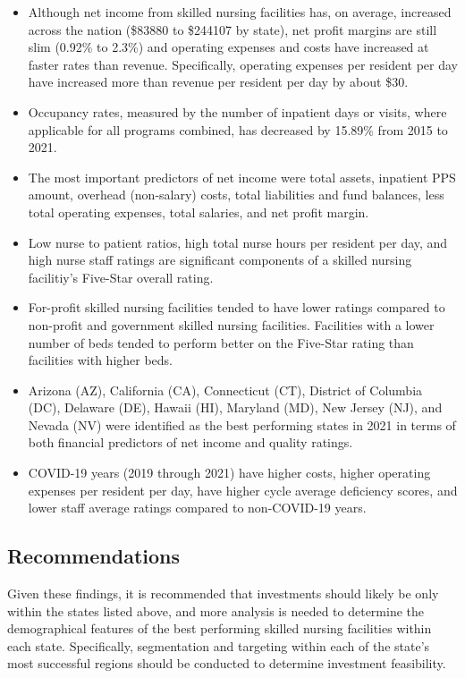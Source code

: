 \documentclass{article}
\theoremstyle{mytheoremstyle}
\theoremstyle{mytheoremstyle}
\theoremstyle{myproblemstyle}
\begin{document}
\begin{itemize}
    \item Although net income from skilled nursing facilities has, on average, increased across the nation (\$83880 to \$244107 by state), net profit margins are still slim (0.92\% to 2.3\%) and operating expenses and costs have increased at faster rates than revenue. Specifically, operating expenses per resident per day have increased more than revenue per resident per day by about \$30. 
    \item Occupancy rates, measured by the number of inpatient days or visits, where applicable for all programs combined, has decreased by 15.89\% from 2015 to 2021.
    \item The most important predictors of net income were total assets, inpatient PPS amount, overhead (non-salary) costs, total liabilities and fund balances, less total operating expenses, total salaries, and net profit margin.
    \item Low nurse to patient ratios, high total nurse hours per resident per day, and high nurse staff ratings are significant components of a skilled nursing facilitiy's Five-Star overall rating. 
    \item For-profit skilled nursing facilities tended to have lower ratings compared to non-profit and government skilled nursing facilities. Facilities with a lower number of beds tended to perform better on the Five-Star rating than facilities with higher beds.
    \item Arizona (AZ), California (CA), Connecticut (CT), District of Columbia (DC), Delaware (DE), Hawaii (HI), Maryland (MD), New Jersey (NJ), and Nevada (NV) were identified as the best performing states in 2021 in terms of both financial predictors of net income and quality ratings.
    \item COVID-19 years (2019 through 2021) have higher costs, higher operating expenses per resident per day, have higher cycle average deficiency scores, and lower staff average ratings compared to non-COVID-19 years. 
\end{itemize}

\subsection{Recommendations}

Given these findings, it is recommended that investments should likely be only within the states listed above, and more analysis is needed to determine the demographical features of the best performing skilled nursing facilities within each state. Specifically, segmentation and targeting within each of the state's most successful regions should be conducted to determine investment feasibility. 
\pagebreak
\end{document}
